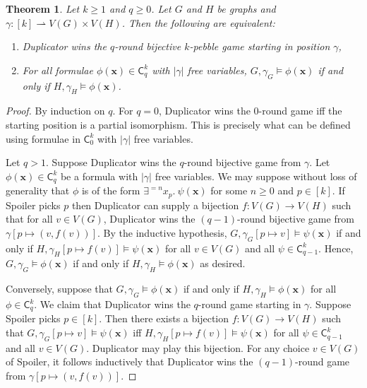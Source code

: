 \documentclass[10pt,a4paper]{article}
\newtheorem{theorem}{Theorem}
\begin{document}
\begin{theorem} \label{thm:hella}
	Let $k\geq 1$ and $q \geq 0$. Let $G$ and $H$ be graphs and $\gamma \colon [k] \rightharpoonup V(G) \times V(H)$. Then the following are equivalent:
	\begin{enumerate}
		\item Duplicator wins the $q$-round bijective $k$-pebble game starting in position $\gamma$,
		\item For all formulae $\phi(\boldsymbol{x}) \in \mathsf{C}^k_q$ with $|\gamma|$ free variables, $G, \gamma_G \models \phi(\boldsymbol{x})$ if and only if $H, \gamma_H \models \phi(\boldsymbol{x})$.
	\end{enumerate}
\end{theorem}
\begin{proof}
	By induction on $q$. For $q = 0$, Duplicator wins the $0$-round game iff the starting position is a partial isomorphism. This is precisely what can be defined using formulae in $\mathsf{C}^{k}_0$ with $|\gamma|$ free variables.
	
	Let $q > 1$. Suppose Duplicator wins the $q$-round bijective game from $\gamma$. Let $\phi(\boldsymbol{x}) \in \mathsf{C}^k_q$ be a formula with $|\gamma|$ free variables. We may suppose without loss of generality that $\phi$ is of the form $\exists^{=n} x_p.\ \psi(\boldsymbol{x})$ for some $n \geq 0$ and $p \in [k]$. If Spoiler picks $p$ then Duplicator can supply a bijection $f \colon V(G) \to V(H)$ such that for all $v \in V(G)$, Duplicator wins the $(q-1)$-round bijective game from $\gamma[p \mapsto (v, f(v))]$. By the inductive hypothesis, $G, \gamma_G[p \mapsto v] \models \psi(\boldsymbol{x})$ if and only if $H, \gamma_H[p \mapsto f(v)] \models \psi(\boldsymbol{x})$ for all $v \in V(G)$ and all $\psi \in \mathsf{C}^k_{q-1}$. Hence, $G, \gamma_G \models \phi(\boldsymbol{x})$ if and only if $H,\gamma_H \models \phi(\boldsymbol{x})$ as desired.
	
	Conversely, suppose that $G, \gamma_G \models \phi(\boldsymbol{x})$ if and only if $H, \gamma_H \models \phi(\boldsymbol{x})$ for all $\phi \in \mathsf{C}^k_q$.
	We claim that Duplicator wins the $q$-round game starting in $\gamma$.
	Suppose Spoiler picks $p \in [k]$.
Then there exists a bijection $f \colon V(G) \to V(H)$ such that $G, \gamma_G[p \mapsto v] \models \psi(\boldsymbol{x})$ iff $H, \gamma_H[p \mapsto f(v)] \models \psi(\boldsymbol{x})$ for all $\psi \in \mathsf{C}^k_{q-1}$ and all $v \in V(G)$.
Duplicator may play this bijection. For any choice $v \in V(G)$ of Spoiler, it follows inductively that Duplicator wins the $(q-1)$-round game from $\gamma[p \mapsto (v, f(v))]$.
\end{proof}
\end{document}
